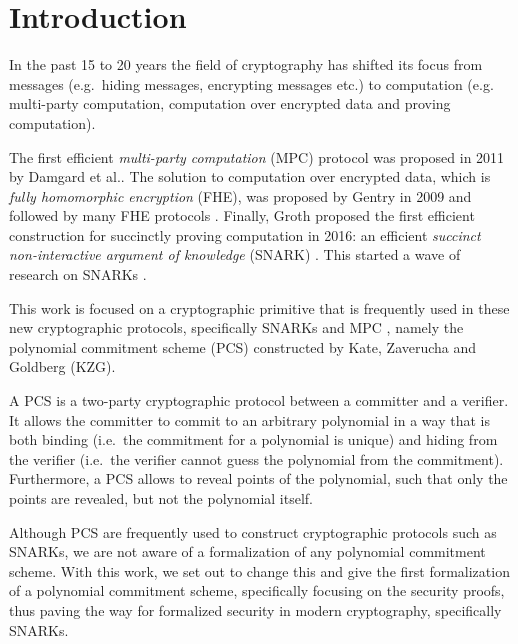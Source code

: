
\chapter{Introduction}\label{chapter:introduction}
In the past 15 to 20 years the field of cryptography has shifted its focus from messages (e.g.\ hiding messages, encrypting messages etc.) to computation (e.g. multi-party computation, computation over encrypted data and proving computation). 

The first efficient \textit{multi-party computation} (MPC) protocol was proposed in 2011 by Damgard et al.\parencite{SPDZ}. The solution to computation over encrypted data, which is \textit{fully homomorphic encryption} (FHE), was proposed by Gentry in 2009 \parencite{fhe} and followed by many FHE protocols \parencite{CKKS,TFHE,BGV,BFV}.
Finally, Groth proposed the first efficient construction for succinctly proving computation in 2016: an efficient \textit{succinct non-interactive argument of knowledge} (SNARK) \parencite{Groth16}. This started a wave of research on SNARKs \parencite{thalerbook,Groth16,Bulletproofs,marlin,sonic,plonk,halo,nova,ProtoStar}.

This work is focused on a cryptographic primitive that is frequently used in these new cryptographic protocols, specifically SNARKs\parencite{plonk,sonic,marlin,halo} and MPC \parencite{PCS_MPC,BDOZ, VSS_MPC, KZG}, namely the polynomial commitment scheme (PCS) constructed by Kate, Zaverucha and Goldberg (KZG)\parencite{KZG}.

A PCS is a two-party cryptographic protocol between a committer and a verifier. It allows the committer to commit to an arbitrary polynomial in a way that is both binding (i.e.\ the commitment for a polynomial is unique) and hiding from the verifier (i.e.\ the verifier cannot guess the polynomial from the commitment). Furthermore, a PCS allows to reveal points of the polynomial, such that only the points are revealed, but not the polynomial itself. 

Although PCS are frequently used to construct cryptographic protocols such as SNARKs, we are not aware of a formalization of any polynomial commitment scheme. With this work, we set out to change this and give the first formalization of a polynomial commitment scheme, specifically focusing on the security proofs, thus paving the way for formalized security in modern cryptography, specifically SNARKs.

